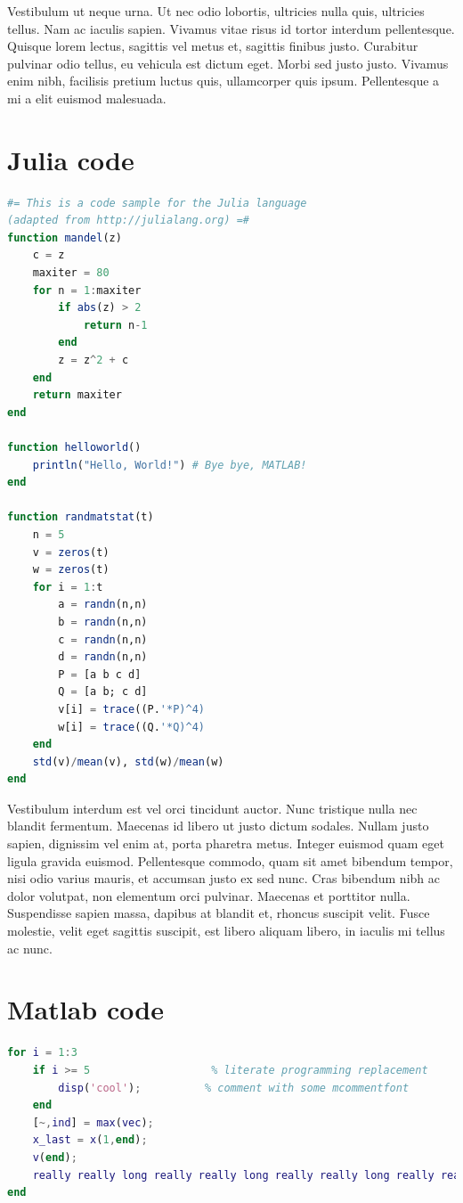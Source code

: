 Vestibulum ut neque urna. Ut nec odio lobortis, ultricies nulla quis, ultricies tellus. Nam ac iaculis sapien. Vivamus vitae risus id tortor interdum pellentesque. Quisque lorem lectus, sagittis vel metus et, sagittis finibus justo. Curabitur pulvinar odio tellus, eu vehicula est dictum eget. Morbi sed justo justo. Vivamus enim nibh, facilisis pretium luctus quis, ullamcorper quis ipsum. Pellentesque a mi a elit euismod malesuada.

\section{Julia code}

\begin{lstlisting}[language=Julia, caption=Julia example]
#= This is a code sample for the Julia language
(adapted from http://julialang.org) =#
function mandel(z)
    c = z
    maxiter = 80
    for n = 1:maxiter
        if abs(z) > 2
            return n-1
        end
        z = z^2 + c
    end
    return maxiter
end

function helloworld()
    println("Hello, World!") # Bye bye, MATLAB!
end

function randmatstat(t)
    n = 5
    v = zeros(t)
    w = zeros(t)
    for i = 1:t
        a = randn(n,n)
        b = randn(n,n)
        c = randn(n,n)
        d = randn(n,n)
        P = [a b c d]
        Q = [a b; c d]
        v[i] = trace((P.'*P)^4)
        w[i] = trace((Q.'*Q)^4)
    end
    std(v)/mean(v), std(w)/mean(w)
end
\end{lstlisting}


Vestibulum interdum est vel orci tincidunt auctor. Nunc tristique nulla nec blandit fermentum. Maecenas id libero ut justo dictum sodales. Nullam justo sapien, dignissim vel enim at, porta pharetra metus. Integer euismod quam eget ligula gravida euismod. Pellentesque commodo, quam sit amet bibendum tempor, nisi odio varius mauris, et accumsan justo ex sed nunc. Cras bibendum nibh ac dolor volutpat, non elementum orci pulvinar. Maecenas et porttitor nulla. Suspendisse sapien massa, dapibus at blandit et, rhoncus suscipit velit. Fusce molestie, velit eget sagittis suscipit, est libero aliquam libero, in iaculis mi tellus ac nunc.

\section{Matlab code}

\begin{lstlisting}[language=Matlab, caption=Matlab example]
for i = 1:3
    if i >= 5                   % literate programming replacement
        disp('cool');          % comment with some mcommentfont
    end
    [~,ind] = max(vec);
    x_last = x(1,end);
    v(end);
    really really long really really long really really long really really long really really long line % blaaaaaaaa
end
\end{lstlisting}

